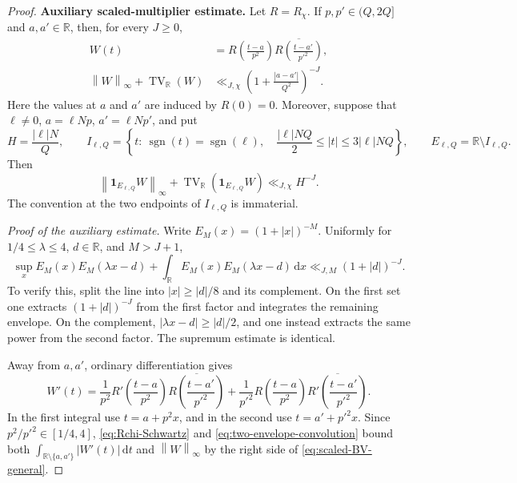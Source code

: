 \documentclass[11pt]{article}
\numberwithin{equation}{section}
\theoremstyle{definition}
\newcommand{\R}{\mathbb R}
\newcommand{\1}{\mathbf 1}
\newcommand{\dd}{\,\mathrm d}
\newcommand{\TV}{\operatorname{TV}}
\newcommand{\sgn}{\operatorname{sgn}}
\newcommand{\norm}[1]{\left\lVert#1\right\rVert}
\begin{document}
\begin{proof}
\medskip
\noindent\textbf{Auxiliary scaled-multiplier estimate.}
Let \(R=R_\chi\).  If \(p,p'\in(Q,2Q]\) and \(a,a'\in\R\), then,
for every \(J\ge0\),
\begin{equation}\label{eq:scaled-BV-general}
 \begin{split}
 W(t)&=R\left(\frac{t-a}{p^2}\right)
       \overline{R\left(\frac{t-a'}{p'^2}\right)},\\
 \norm{W}_\infty+\TV_{\R}(W)
 &\ll_{J,\chi}
 \left(1+\frac{|a-a'|}{Q^2}\right)^{-J}.
 \end{split}
\end{equation}
Here the values at \(a\) and \(a'\) are induced by \(R(0)=0\).
Moreover, suppose that \(\ell\ne0\),
\(a=\ell Np\), \(a'=\ell Np'\), and put
\[
 H=\frac{|\ell|N}{Q},\qquad
 I_{\ell,Q}=\left\{t:\ \sgn(t)=\sgn(\ell),\quad
 \frac{|\ell|NQ}{2}\le|t|\le3|\ell|NQ\right\},
 \qquad E_{\ell,Q}=\R\setminus I_{\ell,Q}.
\]
Then
\begin{equation}\label{eq:scaled-BV-projected}
 \norm{\1_{E_{\ell,Q}}W}_\infty+
 \TV_{\R}(\1_{E_{\ell,Q}}W)
 \ll_{J,\chi}H^{-J}.
\end{equation}
The convention at the two endpoints of \(I_{\ell,Q}\) is immaterial.

\smallskip
\noindent\emph{Proof of the auxiliary estimate.}
Write \(E_M(x)=(1+|x|)^{-M}\).  Uniformly for
\(1/4\le\lambda\le4\), \(d\in\R\), and \(M>J+1\),
\begin{equation}\label{eq:two-envelope-convolution}
 \sup_x E_M(x)E_M(\lambda x-d)+
 \int_{\R}E_M(x)E_M(\lambda x-d)\dd x
 \ll_{J,M}(1+|d|)^{-J}.
\end{equation}
To verify this, split the line into \(|x|\ge|d|/8\) and its
complement.  On the first set one extracts
\((1+|d|)^{-J}\) from the first factor and integrates the remaining
envelope.  On the complement,
\(|\lambda x-d|\ge|d|/2\), and one instead extracts the same power
from the second factor.  The supremum estimate is identical.

Away from \(a,a'\), ordinary differentiation gives
\[
 W'(t)=\frac1{p^2}R'\left(\frac{t-a}{p^2}\right)
 \overline{R\left(\frac{t-a'}{p'^2}\right)}
 +\frac1{p'^2}R\left(\frac{t-a}{p^2}\right)
 \overline{R'\left(\frac{t-a'}{p'^2}\right)}.
\]
In the first integral use \(t=a+p^2x\), and in the second use
\(t=a'+p'^2x\).  Since \(p^2/p'^2\in[1/4,4]\),
\eqref{eq:Rchi-Schwartz} and
\eqref{eq:two-envelope-convolution} bound both
\(\int_{\R\setminus\{a,a'\}}|W'(t)|\dd t\) and
\(\norm{W}_\infty\) by the right side of
\eqref{eq:scaled-BV-general}.


\end{proof}
\end{document}
